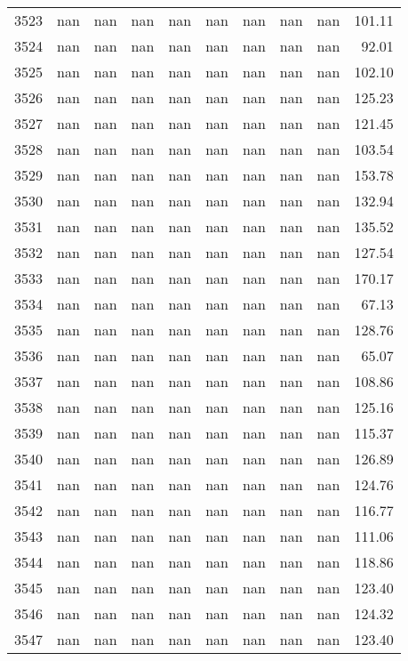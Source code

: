 \begin{tabular}{lrrrrrrrrr}
3523 & nan & nan & nan & nan & nan & nan & nan & nan & 101.11 \\
3524 & nan & nan & nan & nan & nan & nan & nan & nan & 92.01 \\
3525 & nan & nan & nan & nan & nan & nan & nan & nan & 102.10 \\
3526 & nan & nan & nan & nan & nan & nan & nan & nan & 125.23 \\
3527 & nan & nan & nan & nan & nan & nan & nan & nan & 121.45 \\
3528 & nan & nan & nan & nan & nan & nan & nan & nan & 103.54 \\
3529 & nan & nan & nan & nan & nan & nan & nan & nan & 153.78 \\
3530 & nan & nan & nan & nan & nan & nan & nan & nan & 132.94 \\
3531 & nan & nan & nan & nan & nan & nan & nan & nan & 135.52 \\
3532 & nan & nan & nan & nan & nan & nan & nan & nan & 127.54 \\
3533 & nan & nan & nan & nan & nan & nan & nan & nan & 170.17 \\
3534 & nan & nan & nan & nan & nan & nan & nan & nan & 67.13 \\
3535 & nan & nan & nan & nan & nan & nan & nan & nan & 128.76 \\
3536 & nan & nan & nan & nan & nan & nan & nan & nan & 65.07 \\
3537 & nan & nan & nan & nan & nan & nan & nan & nan & 108.86 \\
3538 & nan & nan & nan & nan & nan & nan & nan & nan & 125.16 \\
3539 & nan & nan & nan & nan & nan & nan & nan & nan & 115.37 \\
3540 & nan & nan & nan & nan & nan & nan & nan & nan & 126.89 \\
3541 & nan & nan & nan & nan & nan & nan & nan & nan & 124.76 \\
3542 & nan & nan & nan & nan & nan & nan & nan & nan & 116.77 \\
3543 & nan & nan & nan & nan & nan & nan & nan & nan & 111.06 \\
3544 & nan & nan & nan & nan & nan & nan & nan & nan & 118.86 \\
3545 & nan & nan & nan & nan & nan & nan & nan & nan & 123.40 \\
3546 & nan & nan & nan & nan & nan & nan & nan & nan & 124.32 \\
3547 & nan & nan & nan & nan & nan & nan & nan & nan & 123.40 \\

\end{tabular}
